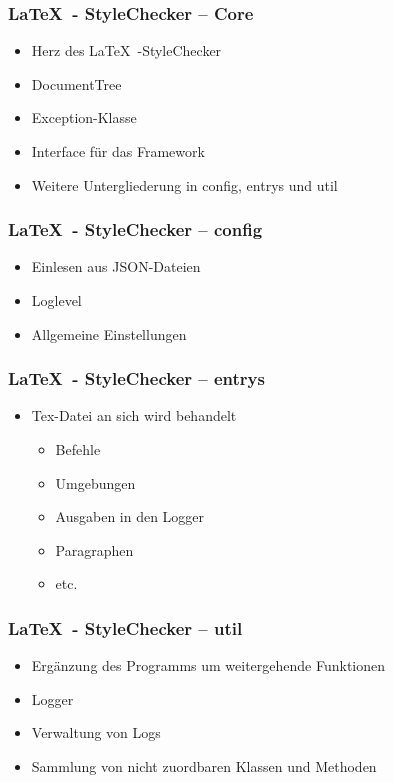 \begin{frame}
\frametitle{\LaTeX~- StyleChecker -- Core}
\begin{block}{\vspace*{-3ex}}
	\begin{itemize}
	  \item Herz des \LaTeX~-StyleChecker
	  \item DocumentTree
	  \item Exception-Klasse
	  \item Interface für das Framework
	  \item Weitere Untergliederung in config, entrys und util
	\end{itemize}
\end{block}
\end{frame}
\begin{frame}
\frametitle{\LaTeX~- StyleChecker -- config}
\begin{block}{\vspace*{-3ex}}
	\begin{itemize}
	  \item Einlesen aus JSON-Dateien
             \item Loglevel
             \item Allgemeine Einstellungen
	\end{itemize}
\end{block}
\end{frame}
\begin{frame}
\frametitle{\LaTeX~- StyleChecker -- entrys}
\begin{block}{\vspace*{-3ex}}
	\begin{itemize}
	  \item Tex-Datei an sich wird behandelt
	   \begin{itemize}
		\item Befehle
		\item Umgebungen
		\item Ausgaben in den Logger
		\item Paragraphen
		\item etc.
	   \end{itemize}
	\end{itemize}
\end{block}
\end{frame}
\begin{frame}
\frametitle{\LaTeX~- StyleChecker -- util}
\begin{block}{\vspace*{-3ex}}
	\begin{itemize}
	  	\item Ergänzung des Programms um weitergehende Funktionen
		\item Logger
		\item Verwaltung von Logs
		\item Sammlung von nicht zuordbaren Klassen und Methoden
	\end{itemize}
\end{block}
\end{frame}